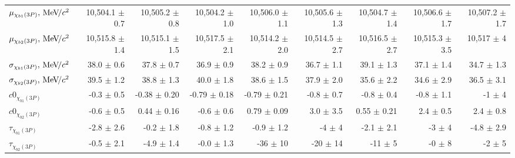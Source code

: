 \begin{table}[H]
{{\begin{tabular}{lrrrrrrrr}
\rule{0pt}{4ex}$\mu_{\chi_{b1}(3P)}, {\mathrm{\,Me\kern -0.1em V\!/}c^2}$ & 10,504.1 $\pm$ 0.7 & 10,505.2 $\pm$ 0.8 & 10,504.2 $\pm$ 1.0 & 10,506.0 $\pm$ 1.1 & 10,505.6 $\pm$ 1.3 & 10,504.7 $\pm$ 1.4 & 10,506.6 $\pm$ 1.7 & 10,507.2 $\pm$ 1.7\\
$\mu_{\chi_{b2}(3P)}, {\mathrm{\,Me\kern -0.1em V\!/}c^2}$ & 10,515.8 $\pm$ 1.4 & 10,515.1 $\pm$ 1.5 & 10,517.5 $\pm$ 2.1 & 10,514.2 $\pm$ 2.0 & 10,514.5 $\pm$ 2.7 & 10,516.5 $\pm$ 2.7 & 10,515.3 $\pm$ 3.5 & 10,517 $\pm$ 4\\

\rule{0pt}{4ex}$\sigma_{\chi_{b1}(3P)}, {\mathrm{\,Me\kern -0.1em V\!/}c^2}$ & 38.0 $\pm$ 0.6 & 37.8 $\pm$ 0.7 & 36.9 $\pm$ 0.9 & 38.2 $\pm$ 0.9 & 36.7 $\pm$ 1.1 & 39.1 $\pm$ 1.3 & 37.1 $\pm$ 1.4 & 34.7 $\pm$ 1.3\\
$\sigma_{\chi_{b2}(3P)}, {\mathrm{\,Me\kern -0.1em V\!/}c^2}$ & 39.5 $\pm$ 1.2 & 38.8 $\pm$ 1.3 & 40.0 $\pm$ 1.8 & 38.6 $\pm$ 1.5 & 37.9 $\pm$ 2.0 & 35.6 $\pm$ 2.2 & 34.6 $\pm$ 2.9 & 36.5 $\pm$ 3.1\\

\rule{0pt}{4ex}$c0_{\chi_{b1}(3P)}$ & -0.3 $\pm$ 0.5 & -0.38 $\pm$ 0.20 & -0.79 $\pm$ 0.18 & -0.79 $\pm$ 0.21 & -0.8 $\pm$ 0.7 & -0.8 $\pm$ 0.4 & -0.8 $\pm$ 1.1 & -1 $\pm$ 4\\
$c0_{\chi_{b2}(3P)}$ & -0.6 $\pm$ 0.5 & 0.44 $\pm$ 0.16 & -0.6 $\pm$ 0.6 & 0.79 $\pm$ 0.09 & 3.0 $\pm$ 3.5 & 0.55 $\pm$ 0.21 & 2.4 $\pm$ 0.5 & 2.4 $\pm$ 0.8\\

\rule{0pt}{4ex}$\tau_{\chi_{b1}(3P)}$ & -2.8 $\pm$ 2.6 & -0.2 $\pm$ 1.8 & -0.8 $\pm$ 1.2 & -0.9 $\pm$ 1.2 & -4 $\pm$ 4 & -2.1 $\pm$ 2.1 & -3 $\pm$ 4 & -4.8 $\pm$ 2.9\\
$\tau_{\chi_{b2}(3P)}$ & -0.5 $\pm$ 2.1 & -4.9 $\pm$ 1.4 & -0.0 $\pm$ 1.3 & -36 $\pm$ 10 & -20 $\pm$ 14 & -11 $\pm$ 5 & -0 $\pm$ 8 & -2 $\pm$ 5\\
\bottomrule
\end{tabular}
} %

} %
\end{table}
